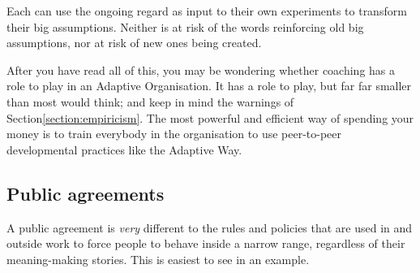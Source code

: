Each can use the ongoing regard as input to their own experiments to transform their big assumptions. Neither is at risk of the words reinforcing old big assumptions, nor at risk of new ones being created. 


After you have read all of this, you may be wondering whether coaching has a role to play in an Adaptive Organisation.  It has a role to play, but far far smaller than most would think; and keep in mind the warnings of Section\ref{section:empiricism}. The most powerful and efficient way of spending your money is to train everybody in the organisation to use peer-to-peer developmental practices like the Adaptive Way.
\subsection{Public agreements} 
\label{section:public-agreements}


A public agreement is \emph{very} different to the rules and policies that are used in and outside work to force people to behave inside a narrow range, regardless of their meaning\hyp{}making stories. This is easiest to see in an example.


